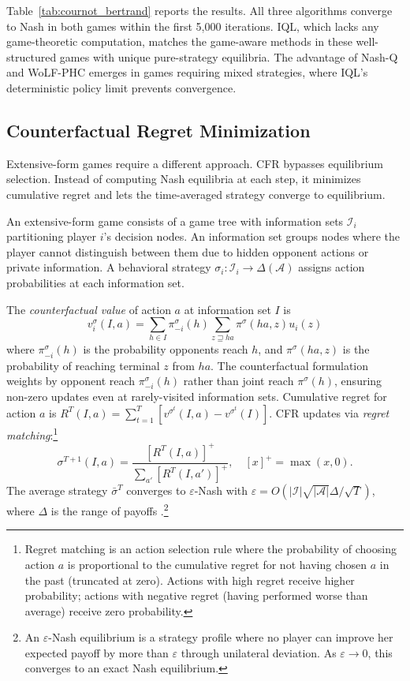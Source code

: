Table~\ref{tab:cournot_bertrand} reports the results. All three algorithms converge to Nash in both games within the first 5,000 iterations. IQL, which lacks any game-theoretic computation, matches the game-aware methods in these well-structured games with unique pure-strategy equilibria. The advantage of Nash-Q and WoLF-PHC emerges in games requiring mixed strategies, where IQL's deterministic policy limit prevents convergence.


\subsection{Counterfactual Regret Minimization}

Extensive-form games require a different approach. CFR bypasses equilibrium selection. Instead of computing Nash equilibria at each step, it minimizes cumulative regret and lets the time-averaged strategy converge to equilibrium.

An extensive-form game consists of a game tree with information sets $\mathcal{I}_i$ partitioning player $i$'s decision nodes. An information set groups nodes where the player cannot distinguish between them due to hidden opponent actions or private information. A behavioral strategy $\sigma_i: \mathcal{I}_i \to \Delta(\mathcal{A})$ assigns action probabilities at each information set.

The \emph{counterfactual value} of action $a$ at information set $I$ is
\begin{equation}
v^\sigma_i(I, a) = \sum_{h \in I} \pi^\sigma_{-i}(h) \sum_{z \sqsupseteq ha} \pi^\sigma(ha, z) u_i(z)
\end{equation}
where $\pi^\sigma_{-i}(h)$ is the probability opponents reach $h$, and $\pi^\sigma(ha, z)$ is the probability of reaching terminal $z$ from $ha$. The counterfactual formulation weights by opponent reach $\pi^\sigma_{-i}(h)$ rather than joint reach $\pi^\sigma(h)$, ensuring non-zero updates even at rarely-visited information sets. Cumulative regret for action $a$ is $R^T(I,a) = \sum_{t=1}^T [v^{\sigma^t}(I,a) - v^{\sigma^t}(I)]$. CFR updates via \emph{regret matching}:\footnote{Regret matching is an action selection rule where the probability of choosing action $a$ is proportional to the cumulative regret for not having chosen $a$ in the past (truncated at zero). Actions with high regret receive higher probability; actions with negative regret (having performed worse than average) receive zero probability.}
\begin{equation}
\sigma^{T+1}(I, a) = \frac{[R^T(I, a)]^+}{\sum_{a'} [R^T(I, a')]^+}, \quad [x]^+ = \max(x,0).
\end{equation}
The average strategy $\bar{\sigma}^T$ converges to $\varepsilon$-Nash with $\varepsilon = O(|\mathcal{I}|\sqrt{|\mathcal{A}|}\Delta / \sqrt{T})$, where $\Delta$ is the range of payoffs \citep{zinkevich2008}.\footnote{An $\varepsilon$-Nash equilibrium is a strategy profile where no player can improve her expected payoff by more than $\varepsilon$ through unilateral deviation. As $\varepsilon \to 0$, this converges to an exact Nash equilibrium.}

